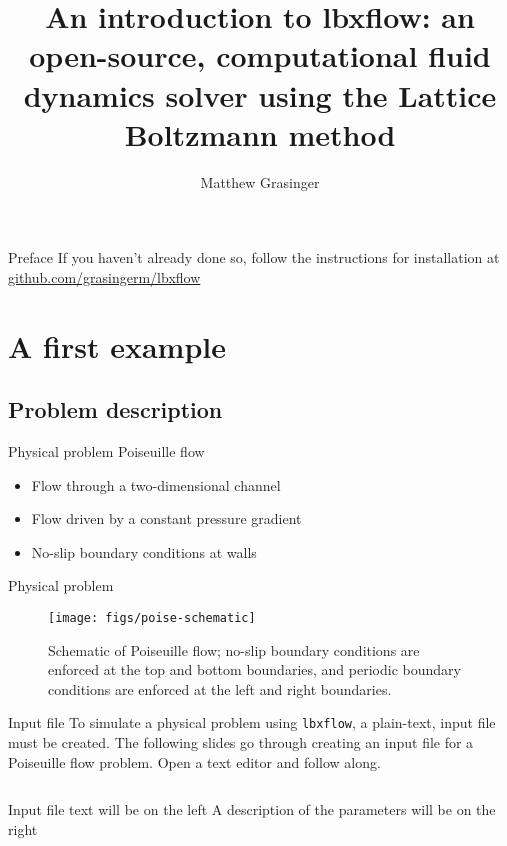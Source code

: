 \documentclass[pdf]{beamer}
\title{An introduction to lbxflow: an open-source, computational fluid dynamics solver using the Lattice Boltzmann method}
\author{Matthew Grasinger}
\begin{document}
\begin{frame}
\titlepage
\end{frame}

\begin{frame}{Preface}
  If you haven't already done so, follow the instructions for installation at \href{https://github.com/grasingerm/lbxflow}{github.com/grasingerm/lbxflow}
\end{frame}

\section{A first example}

\subsection{Problem description}

\begin{frame}{Physical problem}
  Poiseuille flow
  \begin{itemize}
    \item Flow through a two-dimensional channel
    \item Flow driven by a constant pressure gradient
    \item No-slip boundary conditions at walls
  \end{itemize}
\end{frame}

\begin{frame}{Physical problem}
  \begin{figure} \label{fig:poise-schematic}
    \texttt{[image: figs/poise-schematic]}
    \caption{Schematic of Poiseuille flow; no-slip boundary conditions are enforced at the top and bottom boundaries, and periodic boundary conditions are enforced at the left and right boundaries.}
  \end{figure}
\end{frame}

\begin{frame}{Input file}
  To simulate a physical problem using \texttt{lbxflow}, a plain-text, input file must be created.
  The following slides go through creating an input file for a Poiseuille flow problem.
  Open a text editor and follow along.
  \vspace{0.4in}
  \begin{columns}
  \small 
    Input file text will be on the left
    A description of the parameters will be on the right
  \end{columns}
\end{frame}
\end{document}

